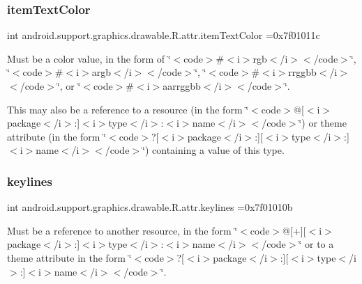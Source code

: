 \subsubsection{\texorpdfstring{item\+Text\+Color}{itemTextColor}}
{\footnotesize\ttfamily int android.\+support.\+graphics.\+drawable.\+R.\+attr.\+item\+Text\+Color =0x7f01011c\hspace{0.3cm}{\ttfamily [static]}}

Must be a color value, in the form of \char`\"{}$<$code$>$\#$<$i$>$rgb$<$/i$>$$<$/code$>$\char`\"{}, \char`\"{}$<$code$>$\#$<$i$>$argb$<$/i$>$$<$/code$>$\char`\"{}, \char`\"{}$<$code$>$\#$<$i$>$rrggbb$<$/i$>$$<$/code$>$\char`\"{}, or \char`\"{}$<$code$>$\#$<$i$>$aarrggbb$<$/i$>$$<$/code$>$\char`\"{}. 

This may also be a reference to a resource (in the form \char`\"{}$<$code$>$@\mbox{[}$<$i$>$package$<$/i$>$\+:\mbox{]}$<$i$>$type$<$/i$>$\+:$<$i$>$name$<$/i$>$$<$/code$>$\char`\"{}) or theme attribute (in the form \char`\"{}$<$code$>$?\mbox{[}$<$i$>$package$<$/i$>$\+:\mbox{]}\mbox{[}$<$i$>$type$<$/i$>$\+:\mbox{]}$<$i$>$name$<$/i$>$$<$/code$>$\char`\"{}) containing a value of this type. \mbox{\label{classandroid_1_1support_1_1graphics_1_1drawable_1_1R_1_1attr_ad3dde851a1427fea57cfeff89813c49c}} 
\subsubsection{\texorpdfstring{keylines}{keylines}}
{\footnotesize\ttfamily int android.\+support.\+graphics.\+drawable.\+R.\+attr.\+keylines =0x7f01010b\hspace{0.3cm}{\ttfamily [static]}}

Must be a reference to another resource, in the form \char`\"{}$<$code$>$@\mbox{[}+\mbox{]}\mbox{[}$<$i$>$package$<$/i$>$\+:\mbox{]}$<$i$>$type$<$/i$>$\+:$<$i$>$name$<$/i$>$$<$/code$>$\char`\"{} or to a theme attribute in the form \char`\"{}$<$code$>$?\mbox{[}$<$i$>$package$<$/i$>$\+:\mbox{]}\mbox{[}$<$i$>$type$<$/i$>$\+:\mbox{]}$<$i$>$name$<$/i$>$$<$/code$>$\char`\"{}. \mbox{\label{classandroid_1_1support_1_1graphics_1_1drawable_1_1R_1_1attr_aa4259dc1ddae8e91fd28209cd7a35c8e}} 
